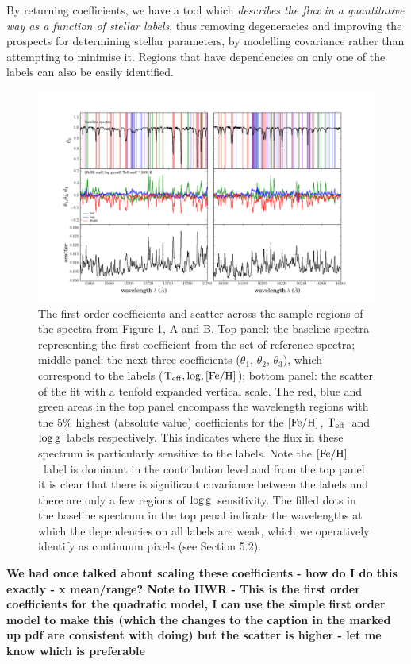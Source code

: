 \documentclass[12pt, preprint]{aastex}
\newcommand{\teff}{\mbox{$\rm T_{eff}$}}
\newcommand{\feh}{\mbox{$\rm [Fe/H]$}}
\newcommand{\logg}{\mbox{$\rm \log g$}}
\begin{document}

By returning coefficients, we have a tool which \textit{describes the flux in a quantitative way as a function of stellar labels}, thus removing degeneracies and improving the prospects for determining stellar parameters, by modelling covariance rather than attempting to minimise it. Regions that have dependencies on only one of the labels can also be easily identified. 

\begin{figure}[h!]
\centering
    \includegraphics[width=\hsize]{./plots/R1_continuum4.png}
  \caption{The first-order coefficients and scatter across the sample regions of the spectra from Figure 1, A and B. Top panel: the baseline spectra representing the first coefficient from the set of reference spectra; middle panel: the next three coefficients ($\theta_1$, $\theta_2$, $\theta_3$),  which correspond to the labels ($\teff, \log, \feh$); bottom panel: the scatter of the fit with a tenfold expanded vertical scale.  The red, blue and green areas in the top panel encompass the wavelength regions with the 5\% highest (absolute value) coefficients for the \feh, \teff\ and \logg\ labels respectively. This indicates where the flux in these spectrum is particularly sensitive to the labels.  Note the \feh\ label is dominant in the contribution level and from the top panel it is clear that there is significant covariance between the labels and there are only a few regions of \logg\ sensitivity. The filled dots in the baseline spectrum in the top penal indicate the wavelengths at which the dependencies on all labels are weak, which we operatively identify as continuum pixels (see Section 5.2).}
\label{fig:coeffs}
\end{figure}
\textbf{We had once talked about scaling these coefficients - how do I do this exactly - x mean/range? Note to HWR - This is the first order coefficients for the quadratic model, I can use the simple first order model to make this (which the changes to the caption in the marked up pdf are consistent with doing) but the scatter is higher - let me know which is preferable}
\end{document}
